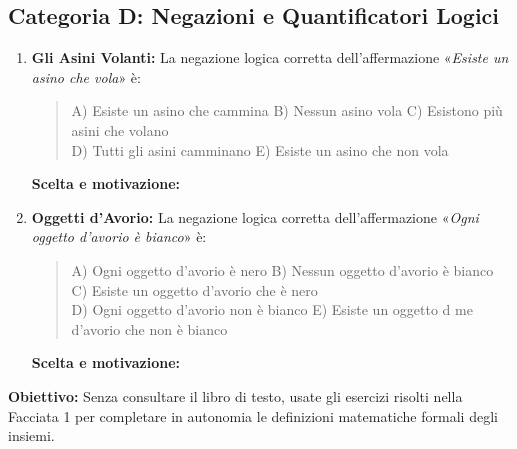 \documentclass[11pt, a4paper]{article}
\begin{document}
\subsection*{Categoria D: Negazioni e Quantificatori Logici}
\begin{enumerate}[resume]
    \item \textbf{Gli Asini Volanti:} La negazione logica corretta dell'affermazione «\textit{Esiste un asino che vola}» è:
    \begin{quote}
    A) Esiste un asino che cammina \quad B) Nessun asino vola \quad C) Esistono più asini che volano \\
    D) Tutti gli asini camminano \quad E) Esiste un asino che non vola
    \end{quote}
    \textbf{Scelta e motivazione:} \dotfill

    \vspace{0.8cm}

    \item \textbf{Oggetti d'Avorio:} La negazione logica corretta dell'affermazione «\textit{Ogni oggetto d'avorio è bianco}» è:
    \begin{quote}
    A) Ogni oggetto d'avorio è nero \quad B) Nessun oggetto d'avorio è bianco \quad C) Esiste un oggetto d'avorio che è nero \\
    D) Ogni oggetto d'avorio non è bianco \quad E) Esiste un oggetto d me d'avorio che non è bianco
    \end{quote}
    \textbf{Scelta e motivazione:} \dotfill
\end{enumerate}

\clearpage


\begin{tcolorbox}[colframe=secondary, title=\Large\bfseries PARTE 2: LABORATORIO DI FORMALIZZAZIONE (SQUADRA ALPHA)]
\textbf{Obiettivo:} Senza consultare il libro di testo, usate gli esercizi risolti nella Facciata 1 per completare in autonomia le definizioni matematiche formali degli insiemi.
\end{tcolorbox}

\vspace{-1mm}
\end{document}
